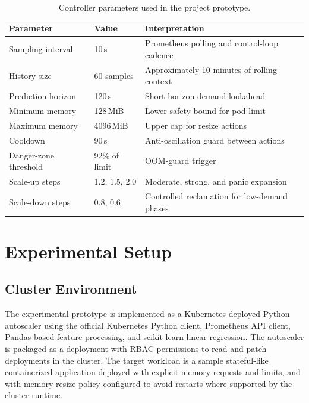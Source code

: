 \documentclass[12pt,a4paper]{article}
\begin{document}
\begin{table}[t]
\centering
\caption{Controller parameters used in the project prototype.}
\label{tab:controller_params}
\begin{tabularx}{\textwidth}{L{4cm}L{2.5cm}Y}
\toprule
\textbf{Parameter} & \textbf{Value} & \textbf{Interpretation} \\
\midrule
Sampling interval & 10\,s & Prometheus polling and control-loop cadence \\
History size & 60 samples & Approximately 10 minutes of rolling context \\
Prediction horizon & 120\,s & Short-horizon demand lookahead \\
Minimum memory & 128\,MiB & Lower safety bound for pod limit \\
Maximum memory & 4096\,MiB & Upper cap for resize actions \\
Cooldown & 90\,s & Anti-oscillation guard between actions \\
Danger-zone threshold & 92\% of limit & OOM-guard trigger \\
Scale-up steps & 1.2, 1.5, 2.0 & Moderate, strong, and panic expansion \\
Scale-down steps & 0.8, 0.6 & Controlled reclamation for low-demand phases \\
\bottomrule
\end{tabularx}
\end{table}

\section{Experimental Setup}
\label{sec:experimental}

\subsection{Cluster Environment}

The experimental prototype is implemented as a Kubernetes-deployed Python autoscaler using the official Kubernetes Python client, Prometheus API client, Pandas-based feature processing, and scikit-learn linear regression. The autoscaler is packaged as a deployment with RBAC permissions to read and patch deployments in the cluster. The target workload is a sample stateful-like containerized application deployed with explicit memory requests and limits, and with memory resize policy configured to avoid restarts where supported by the cluster runtime.
\end{document}
